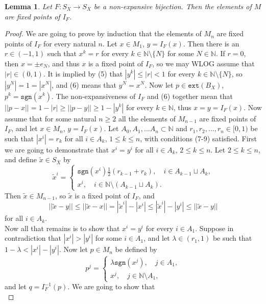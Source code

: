 \documentclass[reqno]{amsart}
\theoremstyle{plain}
\newtheorem{lemma}{Lemma}[section]
\theoremstyle{remark}
\theoremstyle{definition}
\newcommand{\N}{\mathbb N}
\begin{document}
\begin{lemma}\label{lem_main}
    Let $F: S_X\rightarrow S_X$ be a non-expansive bijection. Then the elements of $M$ are fixed points of $I_F$.
\end{lemma}
\begin{proof}
    We are going to prove by induction that the elements of $M_n$ are fixed points of $I_F$ for every natural $n$.
    Let $x \in M_1$, $y = I_F(x)$. Then there is an $r \in (-1,1)$ such that $x^k=r$ for every $k\in \N \setminus \{N\}$ for some $N \in \N$. If $r=0$, then $x=\pm e_N$, and thus $x$ is a fixed point of $I_F$, so we may WLOG assume that $|r|\in (0,1)$. It is implied by (5) that $|y^k|\leq |r|<1$ for every $k \in \N \setminus \{N\}$, so $|y^N|=1=|x^N|$, and (6) means that $y^N=x^N$. Now let $p\in \mathtt{ext}(B_X)$, $p^k=\mathtt{sgn}(x^k)$. The non-expansiveness of $I_F$ and (6) together mean that $||p-x||=1-|r|\geq ||p-y||\geq 1-|y^k|$ for every $k \in \N$, thus $x=y=I_F(x)$.
    Now assume that for some natural $n \geq 2$ all the elements of $M_{n-1}$ are fixed points of $I_F$, and let $x \in M_{n}$, $y=I_F(x)$. Let $A_0,A_1,...A_n\subset \N$ and $r_1,r_2,...,r_n\in [0, 1)$ be such that $|x^i|=r_k$ for all $i \in A_k$, $1 \leq k \leq n$, with conditions (7-9) satisfied. First we are going to demonstrate that $x^i=y^i$ for all $i\in A_k$, $2 \leq k \leq n$. Let $2 \leq k \leq n$, and define $\tilde{x} \in S_X$ by 
     \[\tilde{x}^i=\begin{cases} \mathtt{sgn}(x^i) \frac12  (r_{k-1}+r_k), \quad i \in A_{k-1} \sqcup A_k,\\
    x^i, \quad i \in \N \setminus (A_{k-1} \sqcup A_k).
    \end{cases}\]
    Then $\tilde{x}\in M_{n-1}$, so $\tilde{x}$ is a fixed point of $I_F$, and \[||\tilde{x}-y|| \leq ||\tilde{x}-x||=|\tilde{x}^i|-|x^i|\leq |\tilde{x}^i|-|y^i| \leq ||\tilde{x}-y||\]
    for all $i \in A_k$.\\
    Now all that remains is to show that $x^i=y^i$ for every $i \in A_1$. 
    Suppose in contradiction that $|x^i|>|y^i|$ for some $i \in A_1$, and let $\lambda \in (r_1,1)$ be such that $1-\lambda <|x^i|-|y^i|$. Now let $p \in M_n$ be defined by
    \[p^j=\begin{cases} \lambda \mathtt{sgn}(x^j) , \quad j \in A_1,\\
    x^j, \quad j \in \N \setminus A_1,
    \end{cases}\]
    and let $q=I_F^{-1}(p)$.
    We are going to show that
   \begin{equation}\label{eqns}

\end{equation}
\end{proof}
\end{document}
